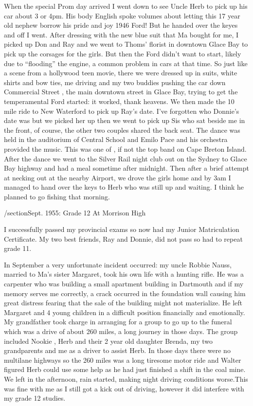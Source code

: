 When the special Prom day arrived I went down to see Uncle Herb to pick up his car about 3 or 4pm. His body English spoke volumes about letting this 17 year old nephew borrow his pride and joy 1946 Ford! But he handed over the keyes and off I went. After dressing with the new blue suit that Ma bought for me, I picked up Don and Ray and we went to Thoms' florist in downtown Glace Bay to pick up the corsages for the girls. But then the Ford didn't want to start, likely due to “flooding” the engine, a common problem in cars at that time. So just like a scene from a hollywood teen movie, there we were dressed up in suits, white shirts and bow ties, me driving and my two buddies pushing the car down Commercial Street , the main downtown street in Glace Bay, trying to get the temperamental Ford started: it worked, thank heavens. We then made the 10 mile ride to New Waterford to pick up Ray's date. I've forgotten who Donnie's date was but we picked her up then we went to pick up Sis who sat beside me in the front, of course, the other two couples shared the back seat. The dance was held in the auditorium of Central School and Emilo Pace and his orchestra provided the music. This was one of , if not the top band on Cape Breton Island. After the dance we went to the Silver Rail night club out on the Sydney to Glace Bay highway and had a meal sometime after midnight. Then after a brief attempt at necking out at the nearby Airport, we drove the girls home and by 3am I managed to hand over the keys to Herb who was still up and waiting. I think he planned to go fishing that morning.

/section{Sept. 1955: Grade 12 At Morrison High}

I successfully passed my provincial exams so now had my Junior Matriculation Certificate. My two best friends, Ray and Donnie, did not pass so had to repeat grade 11.

In September a very unfortunate incident occurred: my uncle Robbie Nauss, married to Ma's sister Margaret, took his own life with a hunting rifle. He was a carpenter who was building a small apartment building in Dartmouth and if my memory serves me correctly, a crack occurred in the foundation wall causing him great distress fearing that the sale of the building might not materialize. He left Margaret and 4 young children in a difficult position financially and emotionally. My grandfather took charge in arranging for a group to go up to the funeral which was a drive of about 260 miles, a long journey in those days. The group included Nookie , Herb and their 2 year old daughter Brenda, my two grandparents and me as a driver to assist Herb. In those days there were no multilane highways so the 260 miles was a long tiresome motor ride and Walter figured Herb could use some help as he had just finished a shift in the coal mine. We left in the afternoon, rain started, making night driving conditions worse.This was fine with me as I still got a kick out of driving, however it did interfere with my grade 12 studies.

